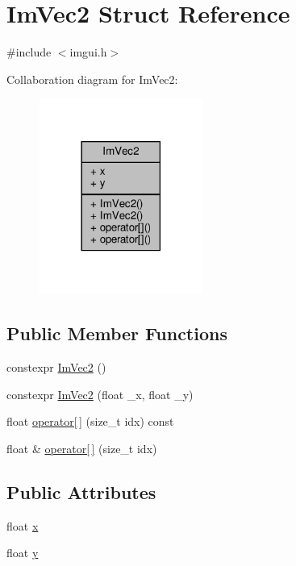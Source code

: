 \hypertarget{structImVec2}{}\section{Im\+Vec2 Struct Reference}
\label{structImVec2}


{\ttfamily \#include $<$imgui.\+h$>$}



Collaboration diagram for Im\+Vec2\+:
\nopagebreak
\begin{figure}[H]
\begin{center}
\leavevmode
\includegraphics[width=153pt]{structImVec2__coll__graph}
\end{center}
\end{figure}
\subsection*{Public Member Functions}
\begin{DoxyCompactItemize}
\item 
constexpr \hyperlink{structImVec2_aa05c0d6514790be9e7510a1d5efe55b0}{Im\+Vec2} ()
\item 
constexpr \hyperlink{structImVec2_ac5df74030ad09fc4616b5191752f5381}{Im\+Vec2} (float \+\_\+x, float \+\_\+y)
\item 
float \hyperlink{structImVec2_ab9d53b9da1e51a5f38ba99bf5522c7f0}{operator\mbox{[}$\,$\mbox{]}} (size\+\_\+t idx) const
\item 
float \& \hyperlink{structImVec2_a04b75dbf3885c5cb9fe0da28471e313a}{operator\mbox{[}$\,$\mbox{]}} (size\+\_\+t idx)
\end{DoxyCompactItemize}
\subsection*{Public Attributes}
\begin{DoxyCompactItemize}
\item 
float \hyperlink{structImVec2_a5802a68560961ed8cb8cc5fb2a244c2d}{x}
\item 
float \hyperlink{structImVec2_a1f9d136ca837e147b793b19d25a3a618}{y}
\end{DoxyCompactItemize}


